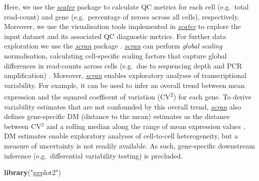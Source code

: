 \documentclass[9pt,a4paper,]{extarticle}
\newenvironment{Shaded}{\begin{snugshade}}{\end{snugshade}}
\newcommand{\KeywordTok}[1]{\textcolor[rgb]{0.13,0.29,0.53}{\textbf{#1}}}
\newcommand{\NormalTok}[1]{#1}
\newcommand{\StringTok}[1]{\textcolor[rgb]{0.31,0.60,0.02}{#1}}
\begin{document}
Here, we use the \emph{\href{https://bioconductor.org/packages/3.11/scater}{scater}} package \citep{McCarthy2017} to calculate
QC metrics for each cell (e.g.~total read-count) and gene (e.g.~percentage of
zeroes across all cells), respectively.
Moreover, we use the visualisation tools implemented in \emph{\href{https://bioconductor.org/packages/3.11/scater}{scater}} to
explore the input dataset and its associated QC diagnostic metrics.
For further data exploration we use the \emph{\href{https://bioconductor.org/packages/3.11/scran}{scran}} package \citep{Lun2016}.
\emph{\href{https://bioconductor.org/packages/3.11/scran}{scran}} can perform \emph{global scaling} normalisation, calculating
cell-specific scaling factors that capture global differences in read-counts
across cells (e.g.~due to sequencing depth and PCR amplification)
\citep{Lun2016pooling}.
Moreover, \emph{\href{https://bioconductor.org/packages/3.11/scran}{scran}} enables exploratory analyses of transcriptional
variability.
For example, it can be used to infer an overall trend between mean expression
and the squared coefficent of variation (CV\textsuperscript{2}) for each gene.
To derive variability estimates that are not confounded by this overall trend,
\emph{\href{https://bioconductor.org/packages/3.11/scran}{scran}} also defines gene-specific DM (distance to the mean)
estimates as the distance between CV\(^2\) and a rolling median along the range
of mean expression values \citep{Kolodziejczyk2015cell}.
DM estimates enable exploratory analyses of cell-to-cell heterogeneity, but a
measure of uncertainty is not readily available. As such, gene-specific
downstream inference (e.g.~differential variability testing) is precluded.

\begin{Shaded}
\begin{Highlighting}[]
\KeywordTok{library}\NormalTok{(}\StringTok{"ggplot2"}\NormalTok{)}
\end{Highlighting}
\end{Shaded}

{\small}
\end{document}
